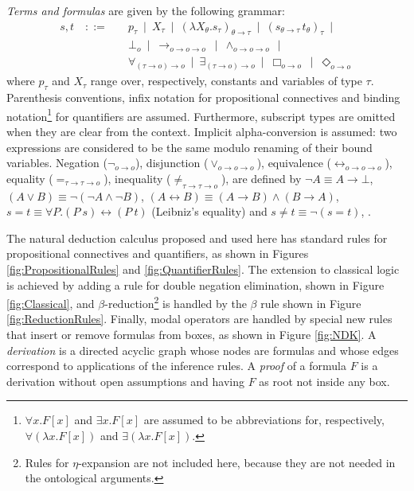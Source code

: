 \documentclass[smallextended]{svjour3}
\newcommand{\imp}{\rightarrow}
\newcommand{\biimp}{\leftrightarrow}
\newcommand{\all}{\forall}
\newcommand{\ex}{\exists}
\newcommand{\nec}{\Box} %
\newcommand{\pos}{\Diamond} %
\begin{document}
\begin{definition} \emph{Terms and formulas} are given by the following grammar:
\begin{align*}
 s,t \quad ::= \quad & 
  p_\tau \ \mid \ 
  X_\tau \ \mid \
  (\lambda X_\theta.s_\tau)_{\theta\imp\tau} \ \mid \ 
  (s_{\theta\imp\tau}\, t_\theta)_\tau \ \mid \\
& \bot_o \ \mid \
  \imp_{o\imp o\imp o} \ \mid \ 
  \wedge_{o\imp o\imp o} \ \mid \\
& \all_{(\tau\imp o)\imp o} \ \mid \ 
  \ex_{(\tau\imp o)\imp o} \ \mid \
  \nec_{o\imp o} \ \mid \
  \pos_{o\imp o}
\end{align*}
where $p_\tau$ and $X_\tau$ range over, respectively, constants and variables of type $\tau$. Parenthesis conventions, infix notation for propositional connectives and binding notation\footnote{$\forall x. F[x]$ and $\exists x. F[x]$ are assumed to be abbreviations for, respectively, $\forall (\lambda x. F[x])$ and $\exists (\lambda x. F[x])$.} for quantifiers are assumed. Furthermore, subscript types are omitted when they are clear from the context. Implicit alpha-conversion is assumed: two expressions are considered to be the same modulo renaming of their bound variables.
Negation ($\neg_{o\imp o}$), disjunction ($\vee_{o\imp o\imp o}$), equivalence ($\biimp_{o\imp o\imp o}$), equality ($=_{\tau\imp\tau\imp o}$), inequality ($\neq_{\tau\imp\tau\imp o}$), are defined by $\neg A\equiv A\imp \bot$, $(A \vee B) \equiv \neg (\neg A \wedge \neg B)$, $ (A\biimp B)\equiv (A\imp B)\wedge (B\imp A)$, $s = t \equiv \forall P. (P \ s) \biimp (P \ t)$ (Leibniz's equality) and $s \neq t\equiv \neg (s=t)$, .
\end{definition}

The natural deduction calculus proposed and used here has standard rules for propositional connectives and quantifiers, as shown in Figures \ref{fig:PropositionalRules} and \ref{fig:QuantifierRules}. The extension to classical logic is achieved by adding a rule for double negation elimination, shown in Figure \ref{fig:Classical}, and $\beta$-reduction\footnote{Rules for $\eta$-expansion \citep{BenzmuellerBrownKohlhase} are not included here, because they are not needed in the ontological arguments.} is handled by the $\beta$ rule shown in Figure \ref{fig:ReductionRules}.
Finally, modal operators are handled by special new rules that insert or remove formulas from boxes, as shown in Figure \ref{fig:NDK}.
A \emph{derivation} is a directed acyclic graph whose nodes are formulas and whose edges correspond to applications of the inference rules. A \emph{proof} of a formula $F$ is a derivation without open assumptions and having $F$ as root not inside any box. 
\end{document}
